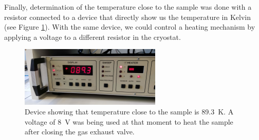 \documentclass[11pt,a4paper]{article}
\begin{document}
Finally, determination of the temperature close to the sample was done with a resistor connected to a device that directly show us the temperature in Kelvin (see Figure \ref{fig:temperature_device}). With the same device, we could control a heating mechanism by applying a voltage to a different resistor in the cryostat.

\begin{figure}[H]
\centering
\includegraphics[width=0.6\textwidth]{temperature_device}
\caption{Device showing that temperature close to the sample is \SI{89.3}{\kelvin}. A voltage of \SI{8}{\volt} was being used at that moment to heat the sample after closing the gas exhaust valve.}
\label{fig:temperature_device}
\end{figure}
\end{document}
